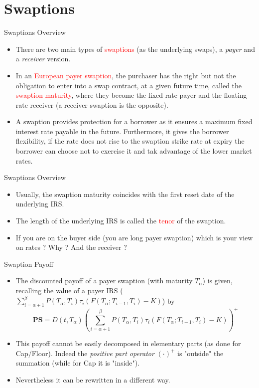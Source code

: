 \documentclass{beamer}
\begin{document}
\section{Swaptions}
\begin{frame}{Swaptions Overview}
\begin{itemize}
	\item There are two main types of \textcolor{red}{swaptions} (as the underlying swaps), a \emph{payer} and a \emph{receiver} version.
	\item In an \textcolor{red}{European payer swaption}, the purchaser has the right but not the obligation to enter into a swap contract, at a given future time, called the \textcolor{red}{swaption maturity},	where they become the fixed-rate payer and the floating-rate receiver (a receiver swaption is the opposite). 
	\item A swaption provides protection for a borrower as it ensures a maximum fixed interest rate payable in the future. Furthermore, it gives the borrower flexibility, if the rate does not rise to the swaption strike rate at expiry the borrower can choose not to exercise it and tak advantage of the lower market rates.
\end{itemize}
\end{frame}

\begin{frame}{Swaptions Overview}
	\begin{itemize}
	\item Usually, the swaption maturity coincides with the first reset date of the underlying IRS.
	\item The length of the underlying IRS is called the \textcolor{red}{tenor} of the swaption.	
	\item If you are on the buyer side (you are long payer swaption) which is your view on rates ? Why ? And the receiver ?
\end{itemize}
\end{frame}

\begin{frame}{Swaption Payoff}
\begin{itemize}
	\item The discounted payoff of a payer swaption (with maturity $T_\alpha$) is given, recalling the value of a payer IRS ($
	\sum_{i=\alpha+1}^\beta P(T_\alpha,T_i)\tau_i (F(T_\alpha;T_{i-1},T_i) - K)$)
	by
	\begin{equation}
		\textbf{PS}=D(t,T_\alpha)\left(\sum_{i=\alpha+1}^\beta P(T_\alpha,T_i)\tau_i (F(T_\alpha;T_{i-1},T_i) - K)\right)^+
	\end{equation}
	\item This payoff cannot be easily decomposed in elementary parts (as done for Cap/Floor). Indeed the \emph{positive part operator} $(\cdot)^+$ is "outside" the summation (while for Cap it is "inside").
	\item Nevertheless it can be rewritten in a different way.
\end{itemize}
\end{frame}
\end{document}
